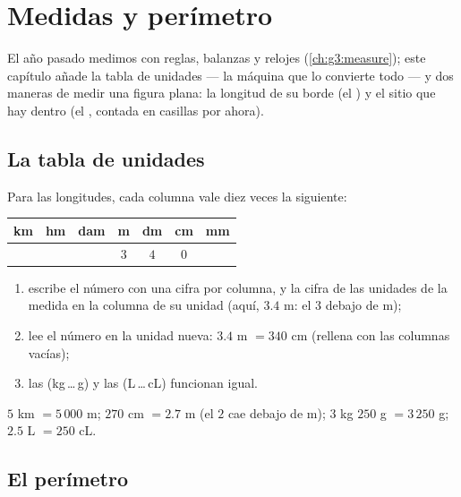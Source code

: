 \chapter{Medidas y perímetro}\label{ch:g4:measure}

El año pasado medimos con reglas, balanzas y relojes
(\cref{ch:g3:measure}); este capítulo añade la tabla de unidades --- la
máquina que lo convierte todo --- y dos maneras de medir una figura
plana: la longitud de su borde (el ) y el sitio que hay dentro
(el , contada en casillas por ahora).

\section{La tabla de unidades}

\begin{method}\label{met:g4:measure:table}
Para las longitudes, cada columna vale diez veces la siguiente:
\begin{center}
\renewcommand{\arraystretch}{1.3}
\begin{tabular}{c|c|c|c|c|c|c}
km & hm & dam & m & dm & cm & mm \\
\hline
 & & & $3$ & $4$ & $0$ & \\
\end{tabular}
\end{center}
\begin{enumerate}
  \item escribe el número con una cifra por columna, y la cifra de las unidades
        de la medida en la columna de su unidad (aquí, $3.4$ m: el $3$
        debajo de m);
  \item lee el número en la unidad nueva: $3.4$ m $= 340$ cm (rellena
        con  las columnas vacías);
  \item las  (kg\,\dots\,g) y las  (L\,\dots\,cL) funcionan
        igual.
\end{enumerate}
\end{method}

\begin{example}\label{ex:g4:measure:convert}
$5$ km $= 5\,000$ m; \quad $270$ cm $= 2.7$ m (el $2$ cae debajo de
m); \quad $3$ kg $250$ g $= 3\,250$ g; \quad
$2.5$ L $= 250$ cL.
\end{example}

\section{El perímetro}


